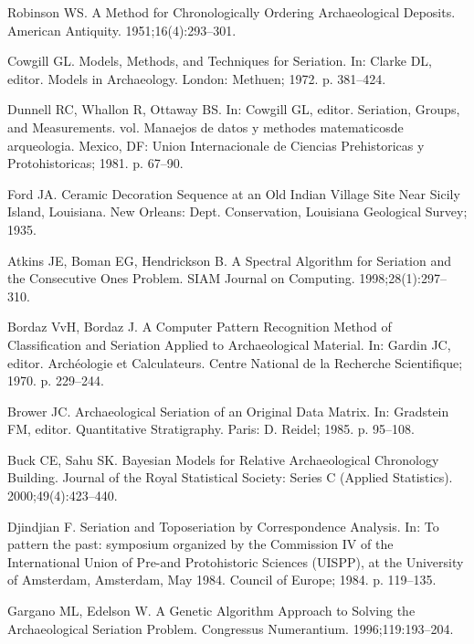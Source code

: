 \documentclass[10pt,letterpaper]{article}
\begin{document}
\begin{thebibliography}{10}
Robinson WS.
\newblock A Method for Chronologically Ordering Archaeological Deposits.
\newblock American Antiquity. 1951;16(4):293--301.

Cowgill GL.
\newblock Models, Methods, and Techniques for Seriation.
\newblock In: Clarke DL, editor. Models in Archaeology. London: Methuen; 1972.
  p. 381--424.

Dunnell RC, Whallon R, Ottaway BS.
\newblock In: Cowgill GL, editor. Seriation, Groups, and Measurements. vol.
  Manaejos de datos y methodes matematicosde arqueologia. Mexico, DF: Union
  Internacionale de Ciencias Prehistoricas y Protohistoricas; 1981. p. 67--90.

Ford JA.
\newblock Ceramic Decoration Sequence at an Old Indian Village Site Near Sicily
  Island, Louisiana.
\newblock New Orleans: Dept. Conservation, Louisiana Geological Survey; 1935.

Atkins JE, Boman EG, Hendrickson B.
\newblock A Spectral Algorithm for Seriation and the Consecutive Ones Problem.
\newblock SIAM Journal on Computing. 1998;28(1):297--310.

Bordaz VvH, Bordaz J.
\newblock A Computer Pattern Recognition Method of Classification and Seriation
  Applied to Archaeological Material.
\newblock In: Gardin JC, editor. Arch{\'e}ologie et Calculateurs. Centre
  National de la Recherche Scientifique; 1970. p. 229--244.

Brower JC.
\newblock Archaeological Seriation of an Original Data Matrix.
\newblock In: Gradstein FM, editor. Quantitative Stratigraphy. Paris: D.
  Reidel; 1985. p. 95--108.

Buck CE, Sahu SK.
\newblock Bayesian Models for Relative Archaeological Chronology Building.
\newblock Journal of the Royal Statistical Society: Series C (Applied
  Statistics). 2000;49(4):423--440.

Djindjian F.
\newblock Seriation and Toposeriation by Correspondence Analysis.
\newblock In: To pattern the past: symposium organized by the Commission IV of
  the International Union of Pre-and Protohistoric Sciences (UISPP), at the
  University of Amsterdam, Amsterdam, May 1984. Council of Europe; 1984. p.
  119--135.

Gargano ML, Edelson W.
\newblock A Genetic Algorithm Approach to Solving the Archaeological Seriation
  Problem.
\newblock Congressus Numerantium. 1996;119:193--204.


\end{thebibliography}
\end{document}
